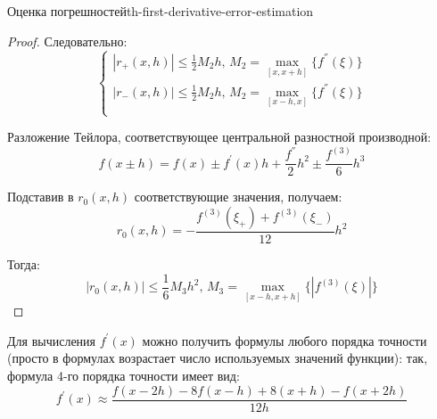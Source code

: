 \documentclass[14pt]{extarticle}
\begin{document}
\begin{theorem}{Оценка погрешностей}{th-first-derivative-error-estimation}
\begin{proof}
            Следовательно:
            $$
            \begin{cases}
                |r_{+}(x, h)| \leq \frac{1}{2}M_{2}h \text{, } M_{2} = \max_{[x, x+h]}\{f^{''}(\xi)\}\\
                |r_{-}(x, h)| \leq \frac{1}{2}M_{2}h \text{, } M_{2} = \max_{[x-h, x]}\{f^{''}(\xi)\}\\
            \end{cases}
            $$

            \vspace{\baselineskip}

            Разложение Тейлора, соответствующее центральной разностной производной:
            $$f(x \pm h) = f(x) \pm f^{'}(x)h + \frac{f^{''}}{2}h^{2} \pm \frac{f^{(3)}}{6}h^{3}$$

            Подставив в $r_{0}(x, h)$ соответствующие значения, получаем:
            $$r_{0}(x, h) = -\frac{f^{(3)}(\xi_{+}) + f^{(3)}(\xi_{-})}{12}h^{2}$$

            Тогда:
            $$|r_{0}(x, h)| \leq \frac{1}{6}M_{3}h^{2} \text{, } M_{3} = \max_{[x - h, x + h]}\{|f^{(3)}(\xi)|\}$$
        \end{proof}
    \end{theorem}

    Для вычисления $f^{'}(x)$ можно получить формулы любого порядка точности (просто в формулах возрастает число используемых значений функции): так, формула 4-го порядка точности имеет вид:
    $$f^{'}(x) \approx \frac{f(x - 2h) - 8f(x - h) + 8(x + h) - f(x + 2h)}{12h}$$
\end{document}
